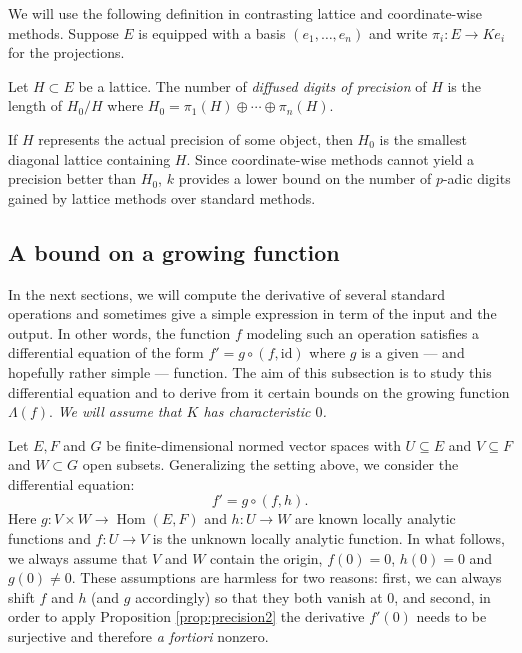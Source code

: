 \documentclass{sig-alternate-2013}
\DeclareMathOperator{\Hom}{Hom}
\newcommand{\id}{\textrm{id}}
\begin{document}
We will use the following definition in contrasting lattice and coordinate-wise methods. 
Suppose $E$ is equipped with a basis $(e_1, \ldots, e_n)$ and write $\pi_i : E \to Ke_i$ for the projections.

\begin{deftn} \label{def:diffused}
Let $H \subset E$ be a lattice. The number of 
\emph{diffused digits of precision} of $H$ is the length of
$H_0/H$ where $H_0 = \pi_1(H) \oplus \cdots \oplus \pi_n(H)$.
\end{deftn}
If $H$ represents the actual precision of some object, then
$H_0$ is the smallest diagonal lattice containing $H$.  Since
coordinate-wise methods cannot yield a precision better than $H_0$,
$k$ provides a lower bound on the number of $p$-adic digits
gained by lattice methods over standard methods.

\subsection{A bound on a growing function}
\label{ssec:boundLambdaf}

In the next sections, we will compute the derivative of several standard 
operations and sometimes give a simple expression in term 
of the input and the output. In other words, the function $f$ modeling
such an operation satisfies a differential equation of the form
$f' = g \circ (f, \id)$  %
where $g$ is a given --- and hopefully rather simple --- function. The 
aim of this subsection is to study this differential equation and to 
derive from it certain bounds on the growing function $\Lambda(f)$. 
\emph{We will assume that $K$ has 
characteristic $0$.}

Let $E, F$ and $G$ be finite-dimensional normed vector spaces with
$U \subseteq E$ and $V \subseteq F$ and $W \subset G$ open subsets.
Generalizing the setting above, we consider the 
differential equation:
\begin{equation}
\label{eq:diffequah}
f' = g \circ (f, h).
\end{equation}
Here $g : V \times W \to \Hom(E, F)$ and $h : U \to W$ are known
locally analytic functions and $f : U \to V$ is the 
unknown locally analytic function. 
In what follows, we always assume that $V$ and $W$ contain the origin, 
$f(0) = 0$, $h(0) = 0$ and $g(0) \neq 0$. These assumptions are harmless 
for two reasons: first, we can always shift $f$ and $h$ (and $g$ 
accordingly) so that they both vanish at $0$, and second, in order to 
apply Proposition \ref{prop:precision2} the derivative $f'(0)$ 
needs to be surjective and therefore \emph{a fortiori} nonzero.
\end{document}
